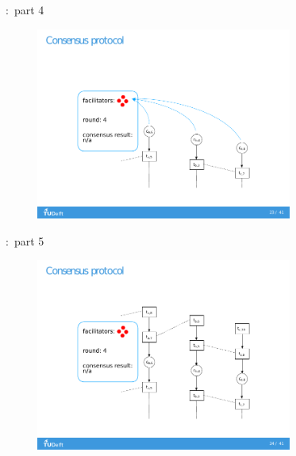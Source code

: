 \documentclass{beamer}
\begin{document}
\begin{frame}[noframenumbering]{\subsecname:~part 4}
  \begin{figure}[h]
  \includegraphics[trim={2cm 1.5cm 2cm 1.5cm},clip,width=0.75\textwidth]{trustchain-4}
  \centering
  \end{figure}
\end{frame}

\begin{frame}[noframenumbering]{\subsecname:~part 5}
  \begin{figure}[h]
  \includegraphics[trim={2cm 1.5cm 2cm 1.5cm},clip,width=0.75\textwidth]{trustchain-5}
  \centering
  \end{figure}
\end{frame}
\end{document}

